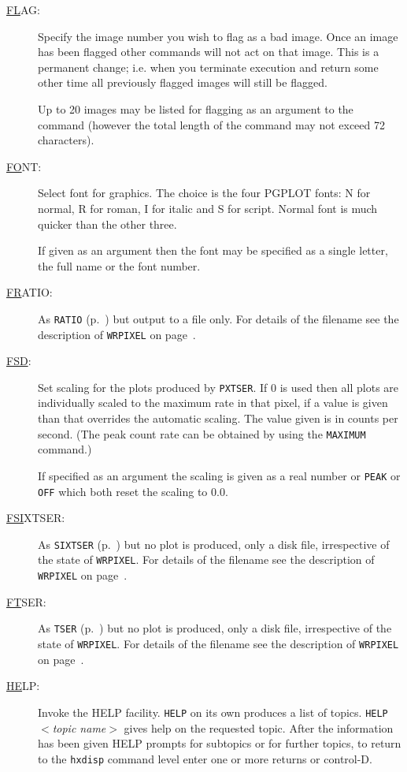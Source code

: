 \begin{description}
\item[\underline{FL}AG: ] \label{fl}
Specify the image number you wish to flag as a bad image.  Once an
image has been flagged other commands will not act on that image. This
is a permanent change; i.e.  when you terminate execution and return
some other time all previously flagged images will still be flagged.

Up to 20 images may be listed for flagging as an argument to the
command (however the total length of the command may not exceed 72
characters).

\item[\underline{FO}NT: ] \label{fo}
Select font for graphics. The choice is the four PGPLOT fonts: N for
normal, R for roman, I for italic and S for script.  Normal font is
much quicker than the other three.

If given as an argument then the font may be specified as a single
letter, the full name or the font number.

\item[\underline{FR}ATIO: ] \label{fr}
As {\tt RATIO} (p.~\pageref{ra}) but output to a file only.  For
details of the filename see the description of {\tt WRPIXEL} on
page~\pageref{wr}.

\item[\underline{FSD}: ] \label{fsd}
Set scaling for the plots produced by {\tt PXTSER}.  If 0 is used then
all plots are individually scaled to the maximum rate in that pixel, if
a value is given than that overrides the automatic scaling. The value
given is in counts per second.  (The peak count rate can be obtained by
using the {\tt MAXIMUM} command.)

If specified as an argument the scaling is given as a real number or
{\tt PEAK} or {\tt OFF} which both reset the scaling to 0.0.

\item[\underline{FSI}XTSER: ] \label{fsi}
As {\tt SIXTSER} (p.~\pageref{six}) but no plot is produced, only a
disk file, irrespective of the state of {\tt WRPIXEL}. For details of
the filename see the description of {\tt WRPIXEL} on page~\pageref{wr}.

\item[\underline{FT}SER: ] \label{ft}
As {\tt TSER} (p.~\pageref{ts}) but no plot is produced, only a disk
file, irrespective of the state of {\tt WRPIXEL}. For details of the
filename see the description of {\tt WRPIXEL} on page~\pageref{wr}.

\item[\underline{HE}LP: ] \label{he}
Invoke the HELP facility. {\tt HELP} on its own produces a list of
topics.  {\tt HELP} $<${\em topic name}$>$ gives help on the requested
topic.  After the information has been given HELP prompts for subtopics
or for further topics, to return to the \verb!hxdisp! command level
enter one or more returns or control-D.


\end{description}
